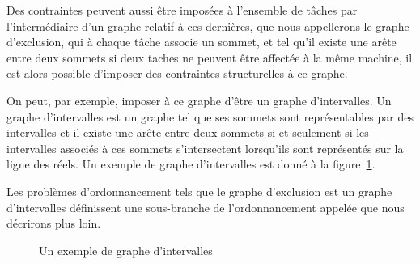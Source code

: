 \documentclass[a4paper,11pt]{report}
\begin{document}
Des contraintes peuvent aussi être imposées à l'ensemble de tâches par l'intermédiaire d'un graphe
relatif à ces dernières, que nous appellerons le graphe d'exclusion, qui à chaque tâche associe
un sommet, et tel qu'il existe une arête entre deux sommets si deux taches ne peuvent être affectée
à la même machine, il est alors possible d'imposer des contraintes structurelles à ce graphe. 

On peut, par exemple, imposer à ce graphe d'être un graphe d'intervalles. Un graphe d'intervalles
est un graphe tel que ses sommets sont représentables par des intervalles et il existe une arête
entre deux sommets si et seulement si les intervalles associés à ces sommets s'intersectent
lorsqu'ils sont représentés sur la ligne des réels. Un exemple de graphe d'intervalles est donné à la
figure~\ref{fig:ex_gint}. 

Les problèmes d'ordonnancement tels que le graphe d'exclusion est un graphe d'intervalles définissent une
sous-branche de l'ordonnancement appelée \isched{} que nous décrirons plus loin.

\begin{figure}
    \centering
    \caption{Un exemple de graphe d'intervalles}
    \label{fig:ex_gint}
\end{figure}
\end{document}
